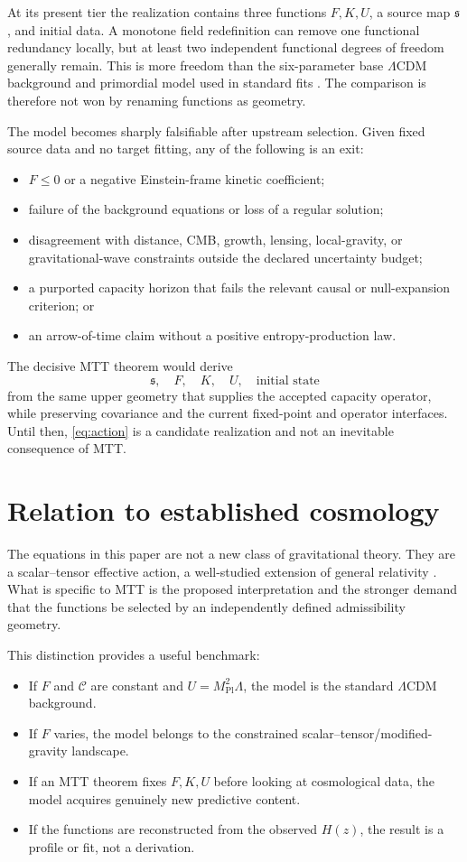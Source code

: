 \documentclass[11pt]{article}
\newcommand{\CC}{\mathcal C}
\newcommand{\mpl}{M_{\mathrm{Pl}}}
\begin{document}
At its present tier the realization contains three functions
$F,K,U$, a source map $\mathfrak s$, and initial data.  A monotone field
redefinition can remove one functional redundancy locally, but at least
two independent functional degrees of freedom generally remain.  This is
more freedom than the six-parameter base $\Lambda$CDM background and
primordial model used in standard fits
\cite{planck_2018_parameters}.  The comparison is therefore not won by
renaming functions as geometry.

The model becomes sharply falsifiable after upstream selection.  Given
fixed source data and no target fitting, any of the following is an exit:
\begin{itemize}
\item $F\leq0$ or a negative Einstein-frame kinetic coefficient;
\item failure of the background equations or loss of a regular solution;
\item disagreement with distance, CMB, growth, lensing, local-gravity, or
gravitational-wave constraints outside the declared uncertainty budget;
\item a purported capacity horizon that fails the relevant causal or
null-expansion criterion; or
\item an arrow-of-time claim without a positive entropy-production law.
\end{itemize}

The decisive MTT theorem would derive
\[
 \mathfrak s,\quad F,\quad K,\quad U,\quad
 \text{initial state}
\]
from the same upper geometry that supplies the accepted capacity
operator, while preserving covariance and the current fixed-point and
operator interfaces.  Until then, \cref{eq:action} is a candidate
realization and not an inevitable consequence of MTT.

\section{Relation to established cosmology}

The equations in this paper are not a new class of gravitational theory.
They are a scalar--tensor effective action, a well-studied extension of
general relativity \cite{brans_dicke_1961,horndeski_1974}.  What is
specific to MTT is the proposed interpretation and the stronger demand
that the functions be selected by an independently defined
admissibility geometry.

This distinction provides a useful benchmark:
\begin{itemize}
\item If $F$ and $\CC$ are constant and $U=\mpl^2\Lambda$, the model is
the standard $\Lambda$CDM background.
\item If $F$ varies, the model belongs to the constrained
scalar--tensor/modified-gravity landscape.
\item If an MTT theorem fixes $F,K,U$ before looking at cosmological
data, the model acquires genuinely new predictive content.
\item If the functions are reconstructed from the observed $H(z)$, the
result is a profile or fit, not a derivation.
\end{itemize}
\end{document}
